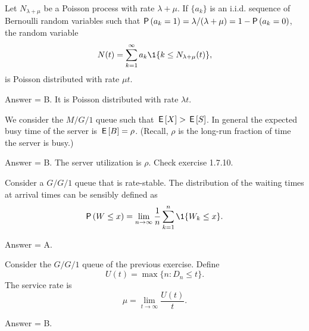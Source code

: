 \begin{exercise}[201902]
  Let $N_{\lambda+\mu}$ be a Poisson process with rate $\lambda+\mu$. If $\{a_k\}$ is an i.i.d. sequence of Bernoulli random variables such that $\P{a_k=1} = \lambda/(\lambda+\mu)=1-\P{a_k=0}$,  the random variable
  \begin{equation*}
    N(t) = \sum_{k=1}^\infty a_k \1{k \leq N_{\lambda+\mu}(t)},
  \end{equation*}
is  Poisson distributed with rate $\mu t$. 

\begin{solution}
Answer = B. It is Poisson distributed with rate $\lambda t$.
\end{solution}
\end{exercise}

\begin{exercise}[201902]
We consider the $M/G/1$ queue such that $\,\mathsf{E}\left[X\right] > \,\mathsf{E}\left[S\right]$. In general the expected busy time of the server is  $\,\mathsf{E}\left[B\right] = \rho$. (Recall, $\rho$ is the long-run fraction of time the server is busy.)
\begin{solution}
Answer = B. The server utilization is $\rho$. Check exercise 1.7.10. 
\end{solution}
\end{exercise}

\begin{exercise}[201902]
Consider a $G/G/1$ queue that is rate-stable. The distribution of the waiting times at
  arrival times can be sensibly defined as
\begin{equation*}
  \P{W \leq x}  = \lim_{n\to\infty} \frac 1n\sum_{k=1}^n \1{W_k\leq x}.
\end{equation*}

\begin{solution}
Answer = A.
\end{solution}
\end{exercise}

\begin{exercise}[201903]
Consider the $G/G/1$ queue of the previous exercise. Define
\begin{equation*}
  U(t) = \max\{n: D_n \leq t\}.
\end{equation*}
 The service rate is 
\begin{equation*}
  \mu = \lim_{t\to\infty} \frac{U(t)}t.
\end{equation*}

\begin{solution}
Answer = B.

\end{solution}
\end{exercise}

